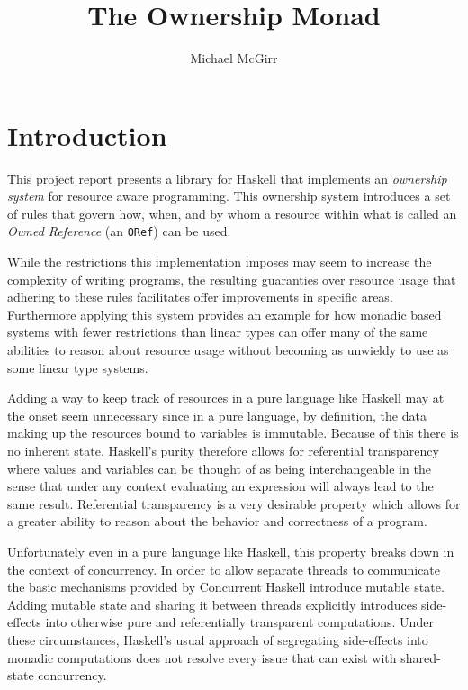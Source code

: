 \documentclass[onehalf,11pt]{beavtex}
\title{The Ownership Monad}
\author{Michael McGirr}
\begin{document}
\maketitle

\mainmatter

\chapter{Introduction}

This project report presents a library for Haskell that implements an
\textit{ownership system} for resource aware programming. This ownership system
introduces a set of rules that govern how, when, and by whom a resource within
what is called an \textit{Owned Reference} (an \texttt{ORef}) can be used.

While the restrictions this implementation imposes may seem to increase the
complexity of writing programs, the resulting guaranties over resource usage
that adhering to these rules facilitates offer improvements in specific areas.
Furthermore applying this system provides an example for how monadic based
systems with fewer restrictions than linear types can offer many of the same
abilities to reason about resource usage without becoming as unwieldy to use
as some linear type systems. 

Adding a way to keep track of resources in a pure language like Haskell may
at the onset seem unnecessary since in a pure language, by definition, %
the data making up the resources bound to variables is immutable. Because of
this there is no inherent state.  Haskell's purity therefore allows for referential
transparency where values and variables can be thought of as being
interchangeable in the sense that under any context evaluating an expression will
always lead to the same result. %
Referential transparency is a very desirable property which allows for a greater
ability to reason about the behavior and correctness of a program.

Unfortunately even in a pure language like Haskell, this property breaks down in
the context of concurrency.  In order to allow separate threads to communicate
the basic mechanisms provided by Concurrent Haskell introduce mutable state.
Adding mutable state and sharing it between threads explicitly introduces
side-effects into otherwise pure and referentially transparent computations.
Under these circumstances, Haskell's usual approach of segregating side-effects
into monadic computations does not resolve every issue that can exist with
shared-state concurrency.
\end{document}
